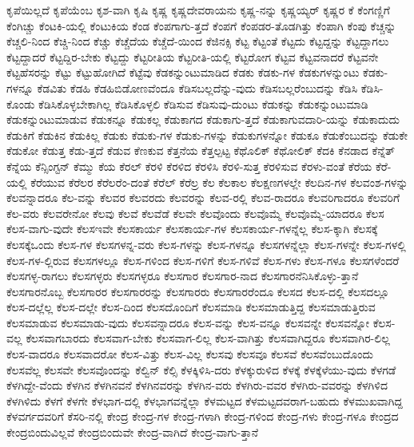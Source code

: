 {ಕೃಪೆಯಿಲ್ಲದೆ
ಕೃಪೆಯೆಂಬ
ಕೃಶ-ವಾಗಿ
ಕೃಷಿ
ಕೃಷ್ಣ
ಕೃಷ್ಣದೇವರಾಯನು
ಕೃಷ್ಣ-ನನ್ನು
ಕೃಷ್ಣಯ್ಯರ್
ಕೃಷ್ಣರ
ಕೆ
ಕೆಂಗಣ್ಣಿಗೆ
ಕೆಂಗಿಚ್ಚು
ಕೆಂಟಕಿ-ಯಲ್ಲಿ
ಕೆಂಟುಕಿಯ
ಕೆಂಡ
ಕೆಂಪಗಾಗು-ತ್ತದೆ
ಕೆಂಪಗೆ
ಕೆಂಪಡರ-ತೊಡಗಿತ್ತು
ಕೆಂಪಾಗಿ
ಕೆಂಪು
ಕೆಚ್ಚನ್ನು
ಕೆಚ್ಚಲಿ-ನಿಂದ
ಕೆಚ್ಚಿ-ನಿಂದ
ಕೆಚ್ಚು
ಕೆಚ್ಚೆದೆಯ
ಕೆಚ್ಚೆದೆ-ಯಿಂದ
ಕೆಜಿನಕ್ಸಿ
ಕೆಟ್ಟ
ಕೆಟ್ಟಂತೆ
ಕೆಟ್ಟದು
ಕೆಟ್ಟದ್ದನ್ನು
ಕೆಟ್ಟದ್ದಾಗಲು
ಕೆಟ್ಟದ್ದಾದರೆ
ಕೆಟ್ಟದ್ದಿರ-ಬೇಕು
ಕೆಟ್ಟದ್ದು
ಕೆಟ್ಟರೀತಿಯ
ಕೆಟ್ಟರೀತಿ-ಯಲ್ಲಿ
ಕೆಟ್ಟರೋಗ
ಕೆಟ್ಟವ
ಕೆಟ್ಟವನಾದರೆ
ಕೆಟ್ಟವನೇ
ಕೆಟ್ಟಹೆಸರನ್ನು
ಕೆಟ್ಟು
ಕೆಟ್ಟುಹೋಗಿದೆ
ಕೆಟ್ಟೆವು
ಕೆಡಕನ್ನುಂಟುಮಾಡಿದ
ಕೆಡಕು
ಕೆಡಕು-ಗಳ
ಕೆಡಕುಗಳನ್ನುಂಟು
ಕೆಡಕು-ಗಳನ್ನೂ
ಕೆಡವಿತು
ಕೆಡಹಿ
ಕೆಡಹಿಬಿಡೋಣವೆಂದೂ
ಕೆಡಿಸಬಲ್ಲದೆನ್ನು-ವುದು
ಕೆಡಿಸಬಲ್ಲರೆಂಬುದನ್ನು
ಕೆಡಿಸಿ
ಕೆಡಿಸಿ-ಕೊಂಡು
ಕೆಡಿಸಿಕೊಳ್ಳಬೇಕಾಗಿಲ್ಲ
ಕೆಡಿಸಿಕೊಳ್ಳಲಿ
ಕೆಡಿಸುವ
ಕೆಡಿಸುವು-ದುಂಟು
ಕೆಡುಕನ್ನು
ಕೆಡುಕನ್ನುಂಟುಮಾಡಿ
ಕೆಡುಕನ್ನುಂಟುಮಾಡುವ
ಕೆಡುಕನ್ನೂ
ಕೆಡುಕಲ್ಲ
ಕೆಡುಕಾಗದ
ಕೆಡುಕಾಗು-ತ್ತದೆ
ಕೆಡುಕಾಗುವದಾರಿ-ಯನ್ನು
ಕೆಡುಕಾದುದು
ಕೆಡುಕಿಗೆ
ಕೆಡುಕಿನ
ಕೆಡುಕಿಲ್ಲ
ಕೆಡುಕು
ಕೆಡುಕು-ಗಳ
ಕೆಡುಕು-ಗಳನ್ನು
ಕೆಡುಕುಗಳನ್ನೋ
ಕೆಡುಕೂ
ಕೆಡುಕೆಂಬುದನ್ನು
ಕೆಡುಕೇ
ಕೆಡುಕೋ
ಕೆಡುತ್ತ
ಕೆಡು-ತ್ತದೆ
ಕೆಡುವ
ಕೆಣಕುವ
ಕೆತ್ತನೆಯ
ಕೆತ್ತಲ್ಪಟ್ಟ
ಕೆಥೊಲಿಕ್
ಕೆಥೋಲಿಕ್
ಕೆದಕಿ
ಕೆನಡಾದ
ಕೆನ್ನೆತ್
ಕೆನ್ನೆಯ
ಕೆನ್ಸಿಂಗ್ಟನ್
ಕೆಮ್ಮು
ಕೆಯ
ಕೆರಲ್
ಕೆರಳಿ
ಕೆರಳಿದ
ಕೆರಳಿಸಿ
ಕೆರಳಿ-ಸುತ್ತ
ಕೆರಳಿಸುವ
ಕೆರಳು-ವಂತೆ
ಕೆರೆಯ
ಕೆರೆ-ಯಲ್ಲಿ
ಕೆರೆಯುವ
ಕೆರೆಲರ
ಕೆರೆಲರೆಂ-ದಂತೆ
ಕೆರೆಲ್
ಕೆರೆಲ್ರ
ಕೆಲ
ಕೆಲಕಾಲ
ಕೆಲಕ್ಷಣಗಳಲ್ಲೇ
ಕೆಲದಿನ-ಗಳ
ಕೆಲವಂಶ-ಗಳನ್ನು
ಕೆಲವನ್ನಾದರೂ
ಕೆಲ-ವನ್ನು
ಕೆಲವರ
ಕೆಲವರದು
ಕೆಲವರನ್ನು
ಕೆಲವ-ರಲ್ಲಿ
ಕೆಲವ-ರಾದರೂ
ಕೆಲವರಿಗಾದರೂ
ಕೆಲವರಿಗೆ
ಕೆಲ-ವರು
ಕೆಲವರೇನೋ
ಕೆಲವು
ಕೆಲವೆ
ಕೆಲವೆಡೆ
ಕೆಲವೇ
ಕೆಲವೊಂದು
ಕೆಲವೊಮ್ಮೆ
ಕೆಲವೊಮ್ಮೆ-ಯಾದರೂ
ಕೆಲಸ
ಕೆಲಸ-ವಾಗು-ವುದೇ
ಕೆಲಸಇವೇ
ಕೆಲಸಕಾರ್ಯ
ಕೆಲಸಕಾರ್ಯ-ಗಳ
ಕೆಲಸಕಾರ್ಯ-ಗಳನ್ನೆಲ್ಲ
ಕೆಲಸ-ಕ್ಕಾಗಿ
ಕೆಲಸಕ್ಕೆ
ಕೆಲಸಕ್ಕೆಒಂದು
ಕೆಲಸ-ಗಳ
ಕೆಲಸಗಳನ್ನ-ವರು
ಕೆಲಸ-ಗಳನ್ನು
ಕೆಲಸ-ಗಳನ್ನೂ
ಕೆಲಸಗಳನ್ನೆಲ್ಲಾ
ಕೆಲಸ-ಗಳನ್ನೇ
ಕೆಲಸ-ಗಳಲ್ಲಿ
ಕೆಲಸ-ಗಳ-ಲ್ಲಿರುವ
ಕೆಲಸಗಳಲ್ಲೂ
ಕೆಲಸ-ಗಳಿಂದ
ಕೆಲಸ-ಗಳಿಗೆ
ಕೆಲಸ-ಗಳಿವೆ
ಕೆಲಸ-ಗಳು
ಕೆಲಸ-ಗಳೂ
ಕೆಲಸಗಳೆಂದರೆ
ಕೆಲಸಗಳ್ಳ-ರಾಗಲು
ಕೆಲಸಗಳ್ಳರು
ಕೆಲಸಗಳ್ಳರೂ
ಕೆಲಸಗಾರ
ಕೆಲಸಗಾರ-ನಾದ
ಕೆಲಸಗಾರನೆನಿಸಿಕೊಳ್ಳು-ತ್ತಾನೆ
ಕೆಲಸಗಾರನೊಬ್ಬ
ಕೆಲಸಗಾರರ
ಕೆಲಸಗಾರರನ್ನು
ಕೆಲಸಗಾರರು
ಕೆಲಸಗಾರರೆಂದೂ
ಕೆಲಸದ
ಕೆಲಸ-ದಲ್ಲಿ
ಕೆಲಸದಲ್ಲೂ
ಕೆಲಸ-ದಲ್ಲೆಲ್ಲ
ಕೆಲಸ-ದಲ್ಲೇ
ಕೆಲಸ-ದಿಂದ
ಕೆಲಸದೊಂದಿಗೆ
ಕೆಲಸಮಾಡಿ
ಕೆಲಸಮಾಡುತ್ತಿದ್ದ
ಕೆಲಸಮಾಡುತ್ತಿರುವ
ಕೆಲಸಮಾಡುವ
ಕೆಲಸಮಾಡು-ವುದು
ಕೆಲಸವನ್ನಾದರೂ
ಕೆಲಸ-ವನ್ನು
ಕೆಲಸ-ವನ್ನೂ
ಕೆಲಸವನ್ನೇ
ಕೆಲಸವನ್ನೋ
ಕೆಲಸ-ವಲ್ಲ
ಕೆಲಸವಾಗಬಾರದು
ಕೆಲಸವಾಗ-ಬೇಕು
ಕೆಲಸವಾಗ-ಲಿಲ್ಲ
ಕೆಲಸ-ವಾಗಿತ್ತು
ಕೆಲಸವಾಗಿದ್ದರೂ
ಕೆಲಸವಾಗಿರ-ಲಿಲ್ಲ
ಕೆಲಸ-ವಾದರೂ
ಕೆಲಸವಾದರೋ
ಕೆಲಸ-ವಿತ್ತು
ಕೆಲಸ-ವಿಲ್ಲ
ಕೆಲಸವು
ಕೆಲಸವೂ
ಕೆಲಸವೆ
ಕೆಲಸವೆಂಬುದೊಂದು
ಕೆಲಸವೆಲ್ಲ
ಕೆಲಸವೇ
ಕೆಲಸವೊಂದನ್ನು
ಕೆಲ್ವಿನ್
ಕೆಲ್ಸಿ
ಕೆಳಕ್ಕಿಳಿಸಿ-ದರು
ಕೆಳಕ್ಕುರುಳಿದ
ಕೆಳಕ್ಕೆ
ಕೆಳಕ್ಕೆಳೆಯು-ವುದು
ಕೆಳಗಡೆ
ಕೆಳಗಿದ್ದೇ-ವೆಂದು
ಕೆಳಗಿನ
ಕೆಳಗಿನವನೆ
ಕೆಳಗಿನವರನ್ನು
ಕೆಳಗಿನ-ವರು
ಕೆಳಗಿರು-ವವರ
ಕೆಳಗಿರು-ವವರನ್ನು
ಕೆಳಗಿಳಿದ
ಕೆಳಗಿಳಿದು
ಕೆಳಗೆ
ಕೆಳಗೇ
ಕೆಳಭಾಗ-ದಲ್ಲಿ
ಕೆಳಭಾಗವನ್ನೆಲ್ಲಾ
ಕೆಳಮಟ್ಟದ
ಕೆಳಮಟ್ಟದವರಾಗ-ಬಹುದು
ಕೆಳಮುಖವಾಗಿದ್ದ
ಕೆಳವರ್ಗದವರಿಗೆ
ಕೆಸರಿ-ನಲ್ಲಿ
ಕೇಂದ್ರ
ಕೇಂದ್ರ-ಗಳ
ಕೇಂದ್ರ-ಗಳಾಗಿ
ಕೇಂದ್ರ-ಗಳಿಂದ
ಕೇಂದ್ರ-ಗಳು
ಕೇಂದ್ರ-ಗಳೂ
ಕೇಂದ್ರದ
ಕೇಂದ್ರಬಿಂದುವಿಲ್ಲವೆ
ಕೇಂದ್ರಬಿಂದುವೇ
ಕೇಂದ್ರ-ವಾಗಿದೆ
ಕೇಂದ್ರ-ವಾಗು-ತ್ತಾನೆ
}
